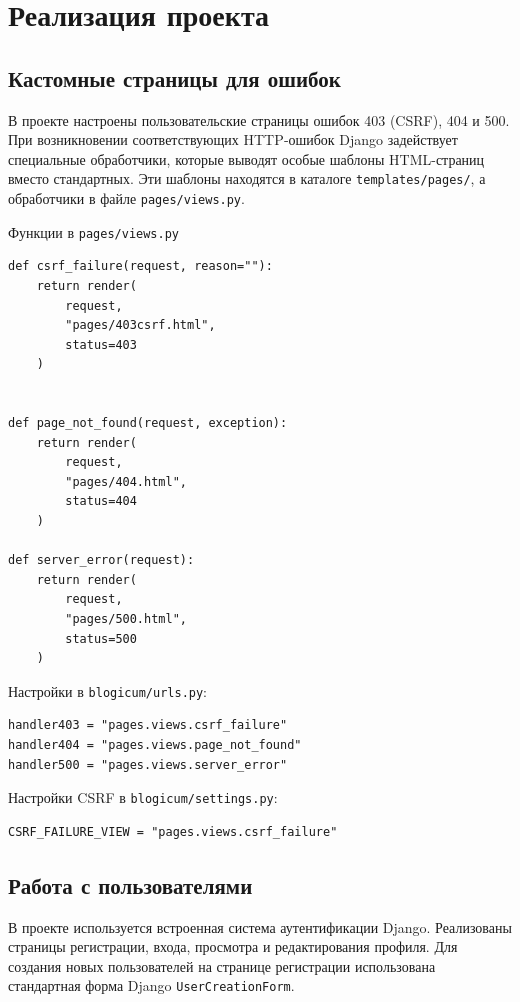 \documentclass[bachelor, och, pract]{SCWorks}
\begin{document}
\section{Реализация проекта}
\subsection{Кастомные страницы для ошибок}

В проекте настроены пользовательские страницы ошибок 403 (CSRF), 404 и 500. 
При возникновении соответствующих HTTP‑ошибок Django задействует специальные обработчики, которые выводят особые шаблоны HTML-страниц вместо стандартных.
Эти шаблоны находятся в каталоге \texttt{templates/pages/}, а обработчики в файле \texttt{pages/views.py}.

Функции в \texttt{pages/views.py}

\begin{lstlisting}
def csrf_failure(request, reason=""):
    return render(
        request,
        "pages/403csrf.html",
        status=403
    )


def page_not_found(request, exception):
    return render(
        request,
        "pages/404.html",
        status=404
    )

def server_error(request):
    return render(
        request,
        "pages/500.html",
        status=500
    )
\end{lstlisting}


Настройки в \texttt{blogicum/urls.py}:

\begin{lstlisting}
handler403 = "pages.views.csrf_failure"
handler404 = "pages.views.page_not_found"
handler500 = "pages.views.server_error"
\end{lstlisting}

Настройки CSRF в \texttt{blogicum/settings.py}:

\begin{lstlisting}
CSRF_FAILURE_VIEW = "pages.views.csrf_failure"
\end{lstlisting}

\newpage
\subsection{Работа с пользователями}
В проекте используется встроенная система аутентификации Django. 
Реализованы страницы регистрации, входа, просмотра и редактирования профиля. 
Для создания новых пользователей на странице регистрации использована стандартная форма Django \texttt{UserCreationForm}.
\end{document}
